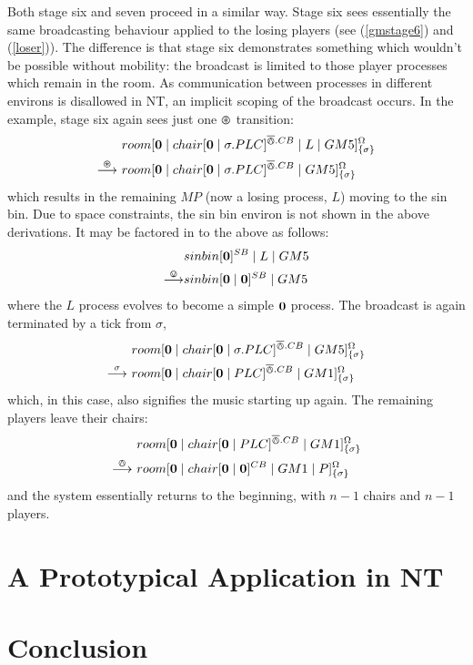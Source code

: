 Both stage six and seven proceed in a similar way.  Stage six sees
essentially the same broadcasting behaviour applied to the losing
players (see (\ref{gmstage6}) and (\ref{loser})).  The difference is
that stage six demonstrates something which wouldn't be possible without
mobility: the broadcast is limited to those player processes which
remain in the room.  As communication between processes in different
environs is disallowed in NT, an implicit scoping of the broadcast
occurs.  In the example, stage six again sees just one $\varoast$
transition:
\begin{equation}
\begin{aligned}
&  {room}[ \textbf{0} \;|\; {chair}[ \textbf{0} \;|\; \sigma.PLC ]^{\overline{\varowedge}.CB} \;|\; 
   L \;|\;
   GM5 ]^{\Omega}_{\{\sigma\}} \\
\stackrel{\varoast}{\longrightarrow}\ & {room}[ \textbf{0} \;|\; {chair}[ \textbf{0} \;|\; \sigma.PLC ]^{\overline{\varowedge}.CB} \;|\;
   GM5 ]^{\Omega}_{\{\sigma\}} \\
\end{aligned}
\end{equation}
which results in the remaining $MP$ (now a losing process, $L$) moving
to the sin bin.  Due to space constraints, the sin bin environ is not
shown in the above derivations.  It may be factored in to the above as
follows:
\begin{equation}
\begin{aligned}
& {sinbin}[ \textbf{0} ]^{SB} \;|\; L \;|\; GM5 \\
\stackrel{\varovee}{\longrightarrow} & {sinbin}[ \textbf{0} \;|\; \textbf{0} ]^{SB} \;|\; GM5
\end{aligned}
\end{equation}
 where the $L$ process evolves to become a simple $\textbf{0}$
process.  The broadcast is again terminated by a tick from $\sigma$,
\begin{equation}
\begin{aligned}
&  {room}[ \textbf{0} \;|\; {chair}[ \textbf{0} \;|\; \sigma.PLC ]^{\overline{\varowedge}.CB} \;|\;
   GM5 ]^{\Omega}_{\{\sigma\}} \\
\stackrel{\sigma}{\longrightarrow}\ & {room}[ \textbf{0} \;|\; {chair}[ \textbf{0} \;|\; PLC ]^{\overline{\varowedge}.CB} \;|\;
   GM1 ]^{\Omega}_{\{\sigma\}} 
\end{aligned}
\end{equation}
which, in this case, also signifies the music starting up again.  The
remaining players leave their chairs:
\begin{equation}
\begin{aligned}
& {room}[ \textbf{0} \;|\; {chair}[ \textbf{0} \;|\; PLC ]^{\overline{\varowedge}.CB} \;|\;
   GM1 ]^{\Omega}_{\{\sigma\}}   \\
\stackrel{\varowedge}{\longrightarrow}\ & {room}[ \textbf{0} \;|\; {chair}[ \textbf{0} \;|\; \textbf{0} ]^{CB} \;|\;
   GM1 \;|\; P ]^{\Omega}_{\{\sigma\}} 
\end{aligned}
\end{equation}
and the system essentially returns to the beginning, with $n -
1$ chairs and $n - 1$ players.

\section{A Prototypical Application in NT}
\label{app:nt}

\section{Conclusion}
